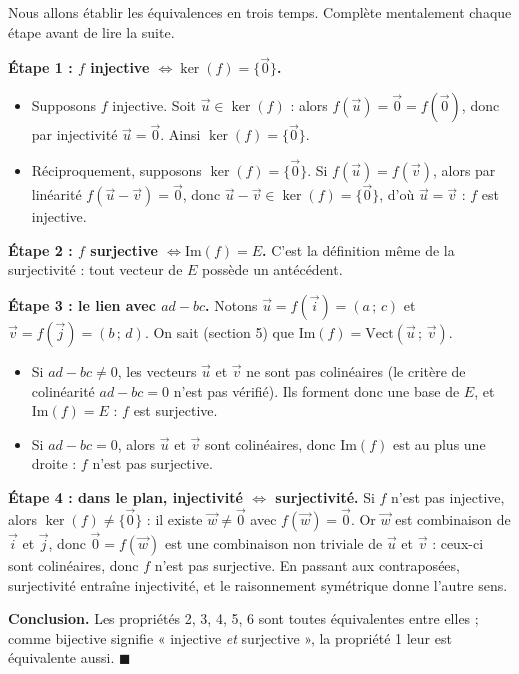 \documentclass[11pt]{article}
\begin{document}
\begin{experience}
Nous allons établir les équivalences en trois temps. Complète mentalement chaque étape avant de lire la suite.

\textbf{Étape 1 : $f$ injective $\iff \ker(f) = \{\vec{0}\}$.}
\begin{itemize}
\item Supposons $f$ injective. Soit $\vec{u} \in \ker(f)$ : alors $f(\vec{u}) = \vec{0} = f(\vec{0})$, donc par injectivité $\vec{u} = \vec{0}$. Ainsi $\ker(f) = \{\vec{0}\}$.
\item Réciproquement, supposons $\ker(f) = \{\vec{0}\}$. Si $f(\vec{u}) = f(\vec{v})$, alors par linéarité $f(\vec{u} - \vec{v}) = \vec{0}$, donc $\vec{u} - \vec{v} \in \ker(f) = \{\vec{0}\}$, d'où $\vec{u} = \vec{v}$ : $f$ est injective.
\end{itemize}

\textbf{Étape 2 : $f$ surjective $\iff \mathrm{Im}(f) = E$.} C'est la définition même de la surjectivité : tout vecteur de $E$ possède un antécédent.

\textbf{Étape 3 : le lien avec $ad - bc$.} Notons $\vec{u} = f(\vec{i}) = (a\,;\,c)$ et $\vec{v} = f(\vec{j}) = (b\,;\,d)$. On sait (section 5) que $\mathrm{Im}(f) = \mathrm{Vect}(\vec{u}\,;\,\vec{v})$.
\begin{itemize}
\item Si $ad - bc \neq 0$, les vecteurs $\vec{u}$ et $\vec{v}$ ne sont pas colinéaires (le critère de colinéarité $ad - bc = 0$ n'est pas vérifié). Ils forment donc une base de $E$, et $\mathrm{Im}(f) = E$ : $f$ est surjective.
\item Si $ad - bc = 0$, alors $\vec{u}$ et $\vec{v}$ sont colinéaires, donc $\mathrm{Im}(f)$ est au plus une droite : $f$ n'est pas surjective.
\end{itemize}

\textbf{Étape 4 : dans le plan, injectivité $\iff$ surjectivité.} Si $f$ n'est pas injective, alors $\ker(f) \neq \{\vec{0}\}$ : il existe $\vec{w} \neq \vec{0}$ avec $f(\vec{w}) = \vec{0}$. Or $\vec{w}$ est combinaison de $\vec{i}$ et $\vec{j}$, donc $\vec{0} = f(\vec{w})$ est une combinaison non triviale de $\vec{u}$ et $\vec{v}$ : ceux-ci sont colinéaires, donc $f$ n'est pas surjective. En passant aux contraposées, surjectivité entraîne injectivité, et le raisonnement symétrique donne l'autre sens.

\textbf{Conclusion.} Les propriétés 2, 3, 4, 5, 6 sont toutes équivalentes entre elles ; comme bijective signifie « injective \emph{et} surjective », la propriété 1 leur est équivalente aussi. $\blacksquare$
\end{experience}
\end{document}
